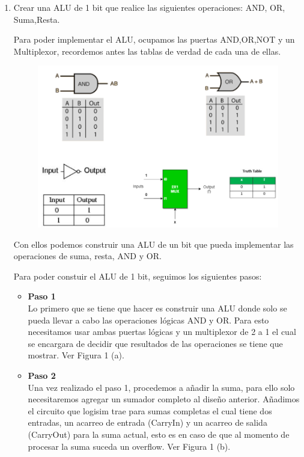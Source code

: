 \documentclass[10pt,letterpaper]{article}
\begin{document}
	\begin{enumerate}
		
		\item Crear una ALU de 1 bit que realice las siguientes operaciones: AND, OR, Suma,Resta.
		
		\hspace*{0.5cm} Para poder implementar el ALU, ocupamos las puertas AND,OR,NOT y un Multiplexor, recordemos antes las tablas de verdad de cada una de ellas.
		
		\begin{figure}[h!]
			\centering
			\includegraphics[scale=0.30]{Gates.png}
		\end{figure}
		
		\hspace*{0.5cm} Con ellos podemos construir una ALU de un bit que pueda implementar las operaciones de suma, resta, AND y OR.
		
		\hspace*{0.5cm}Para poder constuir el ALU de 1 bit, seguimos los siguientes pasos:
		
			\begin{itemize}
				
				\item \textbf{Paso 1}\\
				\hspace*{0.5cm} Lo primero que se tiene que hacer es construir una ALU donde solo se pueda llevar a cabo las operaciones lógicas AND y OR. Para esto necesitamos usar ambas puertas lógicas y un multiplexor de 2 a 1 el cual se encargara de decidir que resultados de las operaciones se tiene que mostrar.
				Ver Figura 1 (a).
				
				\item \textbf{Paso 2}\\
				\hspace*{0.5cm} Una vez realizado el paso 1, procedemos a añadir la suma, para ello solo necesitaremos agregar un sumador completo al diseño anterior. Añadimos el circuito que logisim trae para sumas completas el cual tiene dos entradas, un acarreo de entrada (CarryIn) y un acarreo de salida (CarryOut) para la suma actual, esto es en caso de que al momento de procesar la suma suceda un overflow.
				Ver Figura 1 (b).
				

\end{itemize}
\end{enumerate}
\end{document}
